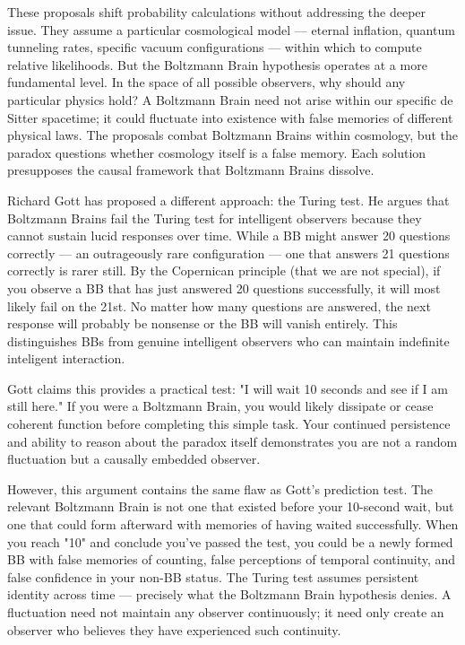 These proposals shift probability calculations without addressing the deeper issue. They assume a particular cosmological model — eternal inflation, quantum tunneling rates, specific vacuum configurations — within which to compute relative likelihoods. But the Boltzmann Brain hypothesis operates at a more fundamental level. In the space of all possible observers, why should any particular physics hold? A Boltzmann Brain need not arise within our specific de Sitter spacetime; it could fluctuate into existence with false memories of different physical laws. The proposals combat Boltzmann Brains within cosmology, but the paradox questions whether cosmology itself is a false memory. Each solution presupposes the causal framework that Boltzmann Brains dissolve.

Richard Gott has proposed a different approach: the Turing test. He argues that Boltzmann Brains fail the Turing test for intelligent observers because they cannot sustain lucid responses over time. While a BB might answer 20 questions correctly — an outrageously rare configuration — one that answers 21 questions correctly is rarer still. By the Copernican principle (that we are not special), if you observe a BB that has just answered 20 questions successfully, it will most likely fail on the 21st. No matter how many questions are answered, the next response will probably be nonsense or the BB will vanish entirely. This distinguishes BBs from genuine intelligent observers who can maintain indefinite inteligent interaction.

Gott claims this provides a practical test: "I will wait 10 seconds and see if I am still here." If you were a Boltzmann Brain, you would likely dissipate or cease coherent function before completing this simple task. Your continued persistence and ability to reason about the paradox itself demonstrates you are not a random fluctuation but a causally embedded observer.

However, this argument contains the same flaw as Gott's prediction test. The relevant Boltzmann Brain is not one that existed before your 10-second wait, but one that could form afterward with memories of having waited successfully. When you reach "10" and conclude you've passed the test, you could be a newly formed BB with false memories of counting, false perceptions of temporal continuity, and false confidence in your non-BB status. The Turing test assumes persistent identity across time — precisely what the Boltzmann Brain hypothesis denies. A fluctuation need not maintain any observer continuously; it need only create an observer who believes they have experienced such continuity.

